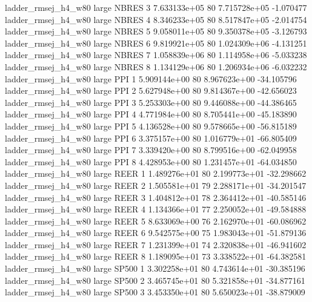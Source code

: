 ladder_rmsej_h4_w80      large    NBRES                 3 7.633133e+05 80   7.715728e+05          -1.070477
ladder_rmsej_h4_w80      large    NBRES                 4 8.346233e+05 80   8.517847e+05          -2.014754
ladder_rmsej_h4_w80      large    NBRES                 5 9.058011e+05 80   9.350378e+05          -3.126793
ladder_rmsej_h4_w80      large    NBRES                 6 9.819921e+05 80   1.024309e+06          -4.131251
ladder_rmsej_h4_w80      large    NBRES                 7 1.058839e+06 80   1.114958e+06          -5.033238
ladder_rmsej_h4_w80      large    NBRES                 8 1.134129e+06 80   1.206934e+06          -6.032232
ladder_rmsej_h4_w80      large      PPI                 1 5.909144e+00 80   8.967623e+00         -34.105796
ladder_rmsej_h4_w80      large      PPI                 2 5.627948e+00 80   9.814367e+00         -42.656023
ladder_rmsej_h4_w80      large      PPI                 3 5.253303e+00 80   9.446088e+00         -44.386465
ladder_rmsej_h4_w80      large      PPI                 4 4.771984e+00 80   8.705441e+00         -45.183890
ladder_rmsej_h4_w80      large      PPI                 5 4.136528e+00 80   9.578665e+00         -56.815189
ladder_rmsej_h4_w80      large      PPI                 6 3.375157e+00 80   1.016779e+01         -66.805409
ladder_rmsej_h4_w80      large      PPI                 7 3.339420e+00 80   8.799516e+00         -62.049958
ladder_rmsej_h4_w80      large      PPI                 8 4.428953e+00 80   1.231457e+01         -64.034850
ladder_rmsej_h4_w80      large     REER                 1 1.489276e+01 80   2.199773e+01         -32.298662
ladder_rmsej_h4_w80      large     REER                 2 1.505581e+01 79   2.288171e+01         -34.201547
ladder_rmsej_h4_w80      large     REER                 3 1.404812e+01 78   2.364412e+01         -40.585146
ladder_rmsej_h4_w80      large     REER                 4 1.134366e+01 77   2.250052e+01         -49.584888
ladder_rmsej_h4_w80      large     REER                 5 8.633069e+00 76   2.162970e+01         -60.086962
ladder_rmsej_h4_w80      large     REER                 6 9.542575e+00 75   1.983043e+01         -51.879136
ladder_rmsej_h4_w80      large     REER                 7 1.231399e+01 74   2.320838e+01         -46.941602
ladder_rmsej_h4_w80      large     REER                 8 1.189095e+01 73   3.338522e+01         -64.382581
ladder_rmsej_h4_w80      large    SP500                 1 3.302258e+01 80   4.743614e+01         -30.385196
ladder_rmsej_h4_w80      large    SP500                 2 3.465745e+01 80   5.321858e+01         -34.877161
ladder_rmsej_h4_w80      large    SP500                 3 3.453350e+01 80   5.650023e+01         -38.879009
